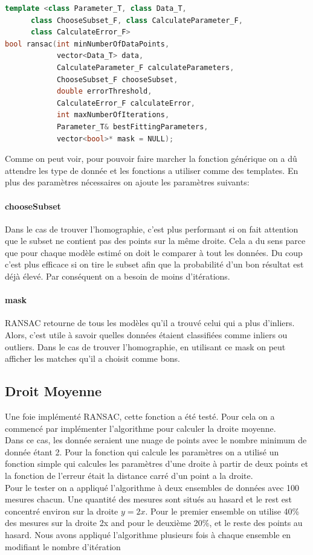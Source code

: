 \documentclass[11pt]{article}
\begin{document}
\begin{lstlisting}[language=c++]
template <class Parameter_T, class Data_T, 
	  class ChooseSubset_F, class CalculateParameter_F,
	  class CalculateError_F>
bool ransac(int minNumberOfDataPoints,
            vector<Data_T> data,
            CalculateParameter_F calculateParameters, 
            ChooseSubset_F chooseSubset,
            double errorThreshold, 
            CalculateError_F calculateError, 
            int maxNumberOfIterations,
            Parameter_T& bestFittingParameters,
            vector<bool>* mask = NULL);
\end{lstlisting}

Comme on peut voir, pour pouvoir faire marcher la fonction générique on a dû attendre les type de donnée et les fonctions a utiliser comme des templates. En plus des paramètres nécessaires on ajoute les paramètres suivants:

\paragraph{chooseSubset}
Dans le cas de trouver l’homographie, c’est plus performant si on fait attention que le subset ne contient pas des points sur la même droite. Cela a du sens parce que pour chaque modèle estimé on doit le comparer à tout les données. Du coup c'est plus efficace si on tire le subset afin que la probabilité d'un bon résultat est déjà élevé. Par conséquent on a besoin de moins d'itérations.

\paragraph{mask}
RANSAC retourne de tous les modèles qu’il a trouvé celui qui a plus d'inliers. Alors, c'est utile à savoir quelles données étaient classifiées comme inliers ou outliers. Dans le cas de trouver l'homographie, en utilisant ce mask on peut afficher les matches qu’il a choisit comme bons.

\subsection{Droit Moyenne}

Une foie implémenté RANSAC, cette fonction a été testé. Pour cela on a commencé par implémenter l’algorithme pour calculer la droite moyenne. \\
Dans ce cas, les donnée seraient une nuage de points avec le nombre minimum de donnée étant 2. Pour la fonction qui calcule les paramètres on a utilisé un fonction simple qui calcules les paramètres d’une droite à partir de deux points et la fonction de l’erreur était la distance carré d’un point a la droite. \\
Pour le tester on a appliqué l’algorithme à deux ensembles de données avec 100 mesures chacun. Une quantité des mesures sont situés au hasard et le rest est concentré environ sur la droite $y = 2x$. Pour le premier ensemble on utilise 40\% des mesures sur la droite 2x and pour le deuxième 20\%, et le reste des points au hasard. Nous avons appliqué l'algorithme plusieurs fois à chaque ensemble en modifiant le nombre d’itération
\end{document}
